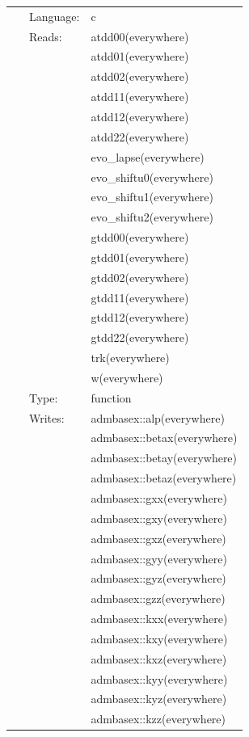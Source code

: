 \documentclass{article}
\begin{document}
 \begin{tabular*}{160mm}{cll} 
~ & Language:  & c \\ 
~ & Reads:  & atdd00(everywhere) \\ 
~& ~ &atdd01(everywhere)\\ 
~& ~ &atdd02(everywhere)\\ 
~& ~ &atdd11(everywhere)\\ 
~& ~ &atdd12(everywhere)\\ 
~& ~ &atdd22(everywhere)\\ 
~& ~ &evo\_lapse(everywhere)\\ 
~& ~ &evo\_shiftu0(everywhere)\\ 
~& ~ &evo\_shiftu1(everywhere)\\ 
~& ~ &evo\_shiftu2(everywhere)\\ 
~& ~ &gtdd00(everywhere)\\ 
~& ~ &gtdd01(everywhere)\\ 
~& ~ &gtdd02(everywhere)\\ 
~& ~ &gtdd11(everywhere)\\ 
~& ~ &gtdd12(everywhere)\\ 
~& ~ &gtdd22(everywhere)\\ 
~& ~ &trk(everywhere)\\ 
~& ~ &w(everywhere)\\ 
~ & Type:  & function \\ 
~ & Writes:  & admbasex::alp(everywhere) \\ 
~& ~ &admbasex::betax(everywhere)\\ 
~& ~ &admbasex::betay(everywhere)\\ 
~& ~ &admbasex::betaz(everywhere)\\ 
~& ~ &admbasex::gxx(everywhere)\\ 
~& ~ &admbasex::gxy(everywhere)\\ 
~& ~ &admbasex::gxz(everywhere)\\ 
~& ~ &admbasex::gyy(everywhere)\\ 
~& ~ &admbasex::gyz(everywhere)\\ 
~& ~ &admbasex::gzz(everywhere)\\ 
~& ~ &admbasex::kxx(everywhere)\\ 
~& ~ &admbasex::kxy(everywhere)\\ 
~& ~ &admbasex::kxz(everywhere)\\ 
~& ~ &admbasex::kyy(everywhere)\\ 
~& ~ &admbasex::kyz(everywhere)\\ 
~& ~ &admbasex::kzz(everywhere)\\ 
\end{tabular*} 
\end{document}
